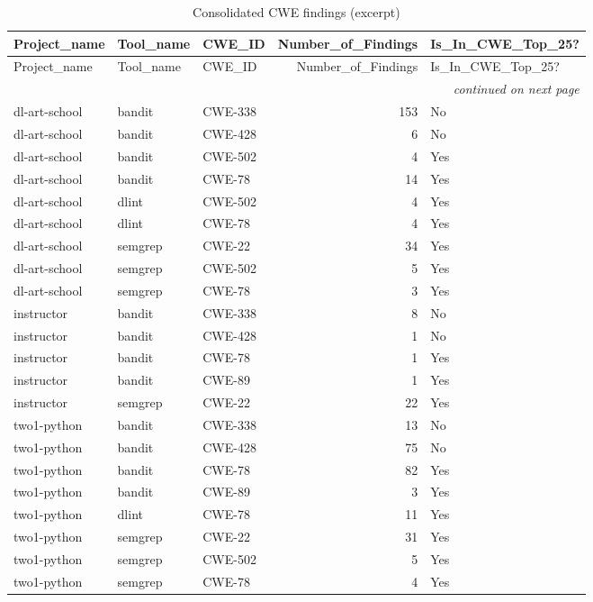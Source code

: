 \begin{longtable}{lllrl}
\caption{Consolidated CWE findings (excerpt)}\\
\toprule
Project\_name & Tool\_name & CWE\_ID & Number\_of\_Findings & Is\_In\_CWE\_Top\_25? \\
\midrule
\endfirsthead
\toprule
Project\_name & Tool\_name & CWE\_ID & Number\_of\_Findings & Is\_In\_CWE\_Top\_25? \\
\midrule
\endhead
\midrule
\multicolumn{5}{r}{\textit{continued on next page}}\\
\endfoot
\bottomrule
\endlastfoot
dl-art-school & bandit   & CWE-338 & 153 & No \\
dl-art-school & bandit   & CWE-428 & 6   & No \\
dl-art-school & bandit   & CWE-502 & 4   & Yes \\
dl-art-school & bandit   & CWE-78  & 14  & Yes \\
dl-art-school & dlint    & CWE-502 & 4   & Yes \\
dl-art-school & dlint    & CWE-78  & 4   & Yes \\
dl-art-school & semgrep  & CWE-22  & 34  & Yes \\
dl-art-school & semgrep  & CWE-502 & 5   & Yes \\
dl-art-school & semgrep  & CWE-78  & 3   & Yes \\
instructor    & bandit   & CWE-338 & 8   & No \\
instructor    & bandit   & CWE-428 & 1   & No \\
instructor    & bandit   & CWE-78  & 1   & Yes \\
instructor    & bandit   & CWE-89  & 1   & Yes \\
instructor    & semgrep  & CWE-22  & 22  & Yes \\
two1-python   & bandit   & CWE-338 & 13  & No \\
two1-python   & bandit   & CWE-428 & 75  & No \\
two1-python   & bandit   & CWE-78  & 82  & Yes \\
two1-python   & bandit   & CWE-89  & 3   & Yes \\
two1-python   & dlint    & CWE-78  & 11  & Yes \\
two1-python   & semgrep  & CWE-22  & 31  & Yes \\
two1-python   & semgrep  & CWE-502 & 5   & Yes \\
two1-python   & semgrep  & CWE-78  & 4   & Yes \\
\end{longtable}





